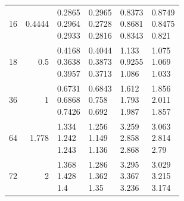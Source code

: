 \begin{longtable}{rrp{2.85cm}p{2.85cm}p{2.85cm}p{2.85cm}}
16 & 0.4444 & \shortstack[r]{0.2865\\0.2964\\0.2933} & \shortstack[r]{0.2965\\0.2728\\0.2816} & \shortstack[r]{0.8373\\0.8681\\0.8343} & \shortstack[r]{0.8749\\0.8475\\0.821} \\
18 & 0.5 & \shortstack[r]{0.4168\\0.3638\\0.3957} & \shortstack[r]{0.4044\\0.3873\\0.3713} & \shortstack[r]{1.133\\0.9255\\1.086} & \shortstack[r]{1.075\\1.069\\1.033} \\
36 & 1 & \shortstack[r]{0.6731\\0.6868\\0.7426} & \shortstack[r]{0.6843\\0.758\\0.692} & \shortstack[r]{1.612\\1.793\\1.987} & \shortstack[r]{1.856\\2.011\\1.857} \\
64 & 1.778 & \shortstack[r]{1.334\\1.242\\1.243} & \shortstack[r]{1.256\\1.149\\1.136} & \shortstack[r]{3.259\\2.858\\2.868} & \shortstack[r]{3.063\\2.814\\2.79} \\
72 & 2 & \shortstack[r]{1.368\\1.428\\1.4} & \shortstack[r]{1.286\\1.362\\1.35} & \shortstack[r]{3.295\\3.367\\3.236} & \shortstack[r]{3.029\\3.215\\3.174} \\

\end{longtable}

